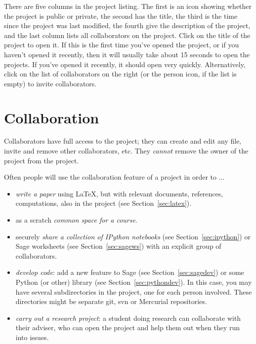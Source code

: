 \documentclass{article}
\begin{document}
There are five columns in the project listing.  The first is an
icon showing whether the project is public or private, the second
has the title, the third is the time since the project was last
modified, the fourth give the description of the project,
and the last column lists all collaborators on the project.
Click on the title of the project to open it.  If this is the first
time you've opened the project, or if you haven't opened it recently,
then it will usually take about 15 seconds to open the projects.
If you've opened it recently, it should open very quickly.
Alternatively, click on the list of collaborators on the right
(or the person icon, if the list is empty) to invite collaborators.


\section{Collaboration}

Collaborators have full access to the project; they can create and
edit any file, invite and remove
other collaborators, etc.  They {\em cannot} remove
the owner of the project from the project.

Often people will use the collaboration feature of a project in
order to ...
\begin{itemize}
\item {\em write a paper} using \LaTeX, but
with relevant documents, references, computations, also in
the project (see Section~\ref{sec:latex}).

\item as a scratch {\em common space for a course}.

\item securely {\em share a collection of IPython notebooks} (see
Section~\ref{sec:ipython}) or Sage
worksheets (see Section~\ref{sec:sagews})
with an explicit group of collaborators.
\item {\em develop code}: add a new feature to Sage (see Section~\ref{sec:sagedev}) or some
Python (or other) library (see Section~\ref{sec:pythondev}).  In this case, you may have several
subdirectories in the project, one for each person involved.
These directories might be separate git, svn or Mercurial
repositories.
\item {\em carry out a research project}: a student doing
research can collaborate with their adviser, who can open
the project and help them out when they run into issues.

\end{itemize}
\end{document}
